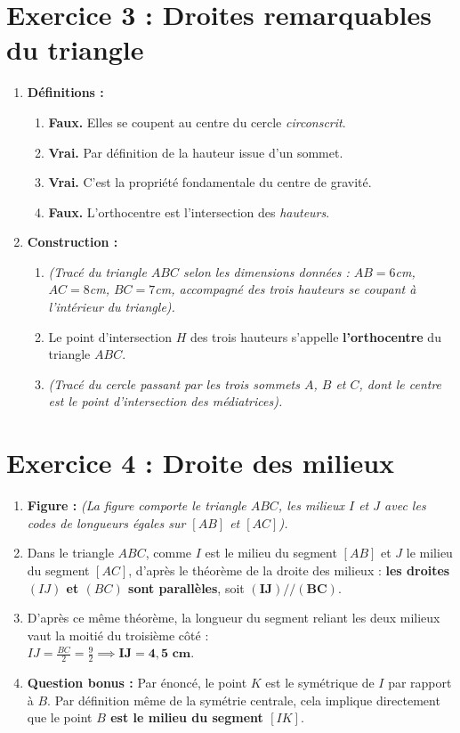 \documentclass[12pt,a4paper]{article}
\begin{document}
\section*{Exercice 3 : Droites remarquables du triangle}
\begin{enumerate}
    \item \textbf{Définitions :}
    \begin{enumerate}
        \item \textbf{Faux.} Elles se coupent au centre du cercle \textit{circonscrit}.
        \item \textbf{Vrai.} Par définition de la hauteur issue d'un sommet.
        \item \textbf{Vrai.} C'est la propriété fondamentale du centre de gravité.
        \item \textbf{Faux.} L'orthocentre est l'intersection des \textit{hauteurs}.
    \end{enumerate}
    \item \textbf{Construction :}
    \begin{enumerate}
        \item \textit{(Tracé du triangle $ABC$ selon les dimensions données : $AB=6$cm, $AC=8$cm, $BC=7$cm, accompagné des trois hauteurs se coupant à l'intérieur du triangle).}
        \item Le point d'intersection $H$ des trois hauteurs s'appelle \textbf{l'orthocentre} du triangle $ABC$.
        \item \textit{(Tracé du cercle passant par les trois sommets $A$, $B$ et $C$, dont le centre est le point d'intersection des médiatrices).}
    \end{enumerate}
\end{enumerate}

\section*{Exercice 4 : Droite des milieux}
\begin{enumerate}
    \item \textbf{Figure :} \textit{(La figure comporte le triangle $ABC$, les milieux $I$ et $J$ avec les codes de longueurs égales sur $[AB]$ et $[AC]$).}
    \item Dans le triangle $ABC$, comme $I$ est le milieu du segment $[AB]$ et $J$ le milieu du segment $[AC]$, d'après le théorème de la droite des milieux : \textbf{les droites $(IJ)$ et $(BC)$ sont parallèles}, soit $\mathbf{(IJ) // (BC)}$.
    \item D'après ce même théorème, la longueur du segment reliant les deux milieux vaut la moitié du troisième côté : \\
    $IJ = \frac{BC}{2} = \frac{9}{2} \implies \mathbf{IJ = 4,5\text{ cm}}$.
    \item \textbf{Question bonus :} Par énoncé, le point $K$ est le symétrique de $I$ par rapport à $B$. Par définition même de la symétrie centrale, cela implique directement que le point \textbf{$B$ est le milieu du segment $[IK]$}.
\end{enumerate}
\end{document}
